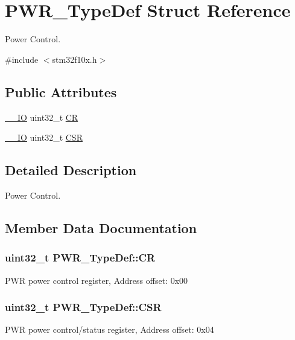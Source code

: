 \hypertarget{struct_p_w_r___type_def}{\section{P\-W\-R\-\_\-\-Type\-Def Struct Reference}
\label{struct_p_w_r___type_def}
}


Power Control.  




{\ttfamily \#include $<$stm32f10x.\-h$>$}

\subsection*{Public Attributes}
\begin{DoxyCompactItemize}
\item 
\hyperlink{group___c_m_s_i_s__core__definitions_gaec43007d9998a0a0e01faede4133d6be}{\-\_\-\-\_\-\-I\-O} uint32\-\_\-t \hyperlink{struct_p_w_r___type_def_aeb6bcdb2b99d58b9a0ffd86deb606eac}{C\-R}
\item 
\hyperlink{group___c_m_s_i_s__core__definitions_gaec43007d9998a0a0e01faede4133d6be}{\-\_\-\-\_\-\-I\-O} uint32\-\_\-t \hyperlink{struct_p_w_r___type_def_ae17097e69c88b6c00033d6fb84a8182b}{C\-S\-R}
\end{DoxyCompactItemize}


\subsection{Detailed Description}
Power Control. 

\subsection{Member Data Documentation}
\hypertarget{struct_p_w_r___type_def_aeb6bcdb2b99d58b9a0ffd86deb606eac}{
\subsubsection[{C\-R}]{ uint32\-\_\-t P\-W\-R\-\_\-\-Type\-Def\-::\-C\-R}}\label{struct_p_w_r___type_def_aeb6bcdb2b99d58b9a0ffd86deb606eac}
P\-W\-R power control register, Address offset\-: 0x00 \hypertarget{struct_p_w_r___type_def_ae17097e69c88b6c00033d6fb84a8182b}{
\subsubsection[{C\-S\-R}]{ uint32\-\_\-t P\-W\-R\-\_\-\-Type\-Def\-::\-C\-S\-R}}\label{struct_p_w_r___type_def_ae17097e69c88b6c00033d6fb84a8182b}
P\-W\-R power control/status register, Address offset\-: 0x04 

